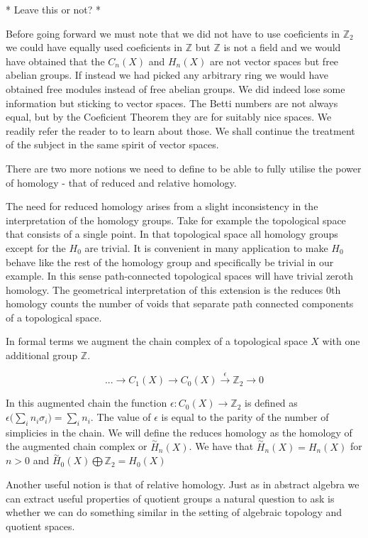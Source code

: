 * Leave this or not? *

Before going forward we must note that we did not have to use coeficients in $\mathbb{Z}_2$ we could have equally used coeficients in $\mathbb{Z}$ but $\mathbb{Z}$ is not a field and we would have obtained that the $C_n(X)$ and $H_n(X)$ are not vector spaces but free abelian groups. If instead we had picked any arbitrary ring we would have obtained free modules instead of free abelian groups. We did indeed lose some information but sticking to vector spaces. The Betti numbers are not always equal, but by the Coeficient Theorem they are for suitably nice spaces. We readily refer the reader to \cite{algebraic-topology} to learn about those. We shall continue the treatment of the subject in the same spirit of vector spaces.

There are two more notions we need to define to be able to fully utilise the power of homology - that of reduced and relative homology.

The need for reduced homology arises from a slight inconsistency in the interpretation of the homology groups. Take for example the topological space that consists of a single point. In that topological space all homology groups except for the $H_0$ are trivial. It is convenient in many application to make $H_0$ behave like the rest of the homology group and specifically be trivial in our example. In this sense path-connected topological spaces will have trivial zeroth homology. The geometrical interpretation of this extension is the reduces 0th homology counts the number of voids that separate path connected components of a topological space.

In formal terms we augment the chain complex of a topological space $X$ with one additional group $\mathbb{Z}$.

$$ ... \longrightarrow C_1(X) \longrightarrow C_0(X) \overset{\epsilon}{\longrightarrow} \mathbb{Z}_2 \longrightarrow 0 $$

In this augmented chain the function $\epsilon: C_0(X) \to \mathbb{Z}_2$ is defined as $\epsilon\big(\sum_{i}n_i\sigma_i\big) = \sum_{i}n_i$. The value of $\epsilon$ is equal to the parity of the number of simplicies in the chain. We will define the reduces homology as the homology of the augmented chain complex or $\overset{\sim}{H}_n(X)$. We have that $\overset{\sim}{H}_n(X) = H_n(X)$ for $n > 0$ and $\overset{\sim}{H}_0(X) \bigoplus \mathbb{Z}_2 = H_0(X) $

Another useful notion is that of relative homology. Just as in abstract algebra we can extract useful properties of quotient groups a natural question to ask is whether we can do something similar in the setting of algebraic topology and quotient spaces. 

